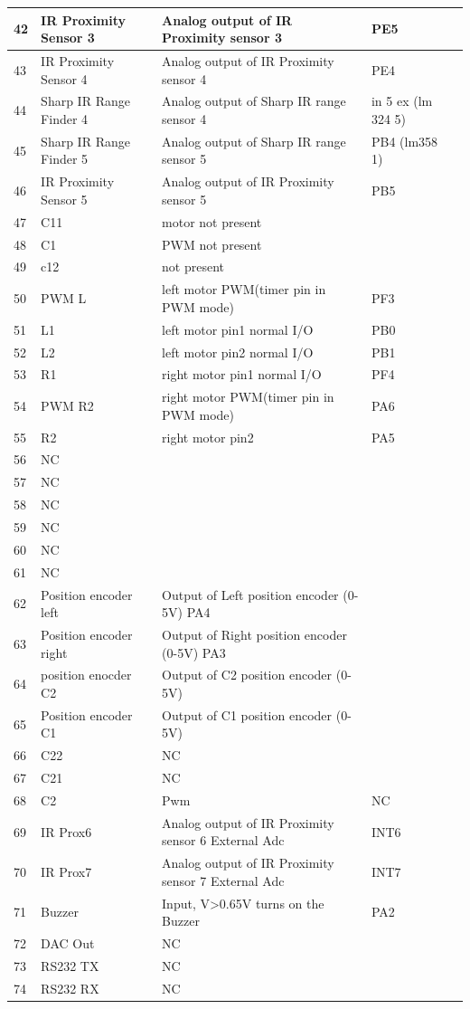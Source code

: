 \documentclass[a4paper,10pt,oneside]{article}
\begin{document}
{\begin{longtable}{|p{}|p{}|p{}|p{}|p{}|}
				42&	IR Proximity Sensor 3&	Analog output of IR Proximity sensor 3	&PE5\\ \hline
				43&	IR Proximity Sensor 4&	Analog output of IR Proximity sensor 4&	PE4\\ \hline
				44&	Sharp IR Range Finder 4	&Analog output of Sharp IR range sensor 4&	in 5 ex (lm 324 5)\\ \hline
				45&	Sharp IR Range Finder 5&	Analog output of Sharp IR range sensor 5&	PB4 (lm358 1)\\ \hline
				46&	IR Proximity Sensor 5&	Analog output of IR Proximity sensor 5&	PB5\\ \hline
				47&	C11& motor 	not present&	\\ \hline
				48&	C1 &PWM	not present	&\\ \hline
				49&	c12&	not present	&\\ \hline
				50&	PWM L&	left motor PWM(timer pin in PWM mode)&	PF3\\ \hline
				51&	L1&	left motor pin1 normal I/O&	PB0\\ \hline
				52&	L2&	left motor pin2 normal I/O&	PB1\\ \hline
				53&	R1&	right motor pin1 normal I/O&	PF4\\ \hline
				54&	PWM R2&	right motor PWM(timer pin in PWM  mode)&	PA6\\ \hline
				55&	R2&	right motor pin2&	PA5\\ \hline
				56&	NC&&	\\ \hline	
				57&	NC&&	\\ \hline	
				58&	NC&&	\\ \hline	
				59&	NC&&	\\ \hline	
				60&	NC&&	\\ \hline	
				61&	NC	&&	\\ \hline
				62&	Position encoder left&	Output of Left position encoder (0-5V)	PA4&&\\ \hline
				63&	Position encoder right& 	Output of Right position encoder (0-5V)	PA3&&\\ \hline
				64&	position enocder C2&	Output of C2 position encoder (0-5V)&&	\\ \hline
				65&	Position encoder C1& Output of C1 position encoder (0-5V)&&	\\ \hline
				66&	C22&	NC&	\\ \hline
				67&	C21	& NC&	\\ \hline
				68&	C2&Pwm&	NC	\\ \hline
				69&	IR Prox6&	Analog output of IR Proximity sensor 6	External Adc &INT6\\ \hline
				70&	IR Prox7&	Analog output of IR Proximity sensor 7	External Adc &INT7\\ \hline
				71&	Buzzer&	Input, V>0.65V turns on the Buzzer&	PA2\\ \hline
				72&	DAC Out&	NC&	\\ \hline
				73&	RS232 TX&	NC&	\\ \hline
				74&	RS232 RX&	NC&	\\ \hline


\end{longtable}}
\end{document}
